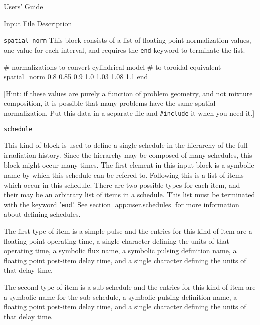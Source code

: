 \begin{chapter}{Users' Guide\label{app:user.guide}}
\begin{section}{Input File Description\label{app:user.input}}
\begin{subsection}{\texttt{spatial\_norm}\label{app:user.input.norm}}
      This block consists of a list of floating point normalization
      values, one value for each interval, and requires the
      \texttt{end} keyword to terminate the list.

      \begin{center}
        \renewcommand{\baselinestretch}{1}\normalsize
        \begin{boxedverbatim}
# normalizations to convert cylindrical model
# to toroidal equivalent
spatial_norm
   0.8
   0.85
   0.9
   1.0
   1.03
   1.08
   1.1
end
\end{boxedverbatim}
      \end{center}

      [Hint: if these values are purely a function of problem
      geometry, and not mixture composition, it is possible that many
      problems have the same spatial normalization.  Put this data in
      a separate file and \texttt{\#include} it when you need it.]
      
    \end{subsection}
   
    \begin{subsection}{\texttt{schedule}\label{app:user.input.sched}}
      
      This kind of block is used to define a single schedule in the
      hierarchy of the full irradiation history.  Since the hierarchy
      may be composed of many schedules, this block might occur many
      times.  The first element in this input block is a symbolic name
      by which this schedule can be refered to.  Following this is a
      list of items which occur in this schedule.  There are two
      possible types for each item, and their may be an arbitrary list
      of items in a schedule.  This list must be terminated with the
      keyword '\texttt{end}'.  See section \ref{app:user.schedules}
      for more information about defining schedules.
      
      The first type of item is a simple pulse and the entries for
      this kind of item are a floating point operating time, a single
      character defining the units of that operating time, a symbolic
      flux name, a symbolic pulsing definition name, a floating point
      post-item delay time, and a single character defining the units
      of that delay time.
      
      The second type of item is a sub-schedule and the entries for
      this kind of item are a symbolic name for the sub-schedule, a
      symbolic pulsing definition name, a floating point post-item delay
      time, and a single character defining the units of that delay
      time.
      

\end{subsection}
\end{section}
\end{chapter}
